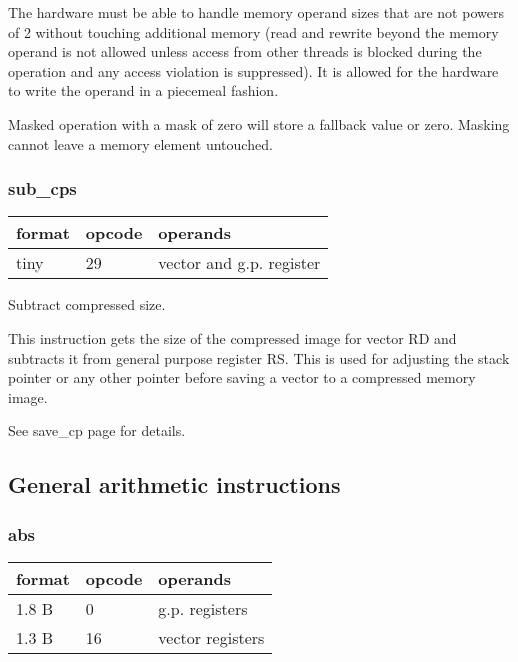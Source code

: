 \documentclass[forwardcom.tex]{subfiles}
\begin{document}
The hardware must be able to handle memory operand sizes that are not powers of 2 without touching additional memory (read and rewrite beyond the memory operand is not allowed unless access from other threads is blocked during the operation and any access violation is suppressed). 
It is allowed for the hardware to write the operand in a piecemeal fashion.
\vspace{2mm}

Masked operation with a mask of zero will store a fallback value or zero. Masking cannot leave a memory element untouched.

\subsubsection{sub\_cps}
\label{table:subCpsInstruction}
\begin{tabular}{|p{12mm}|p{12mm}|p{110mm}|}
\hline
\bfseries format & \bfseries opcode & \bfseries operands \\ \hline
tiny & 29 & vector and g.p. register \\ \hline
\end{tabular}
\vspace{2mm}

Subtract compressed size.
\vspace{2mm}

This instruction gets the size of the compressed image for vector RD and subtracts it from general purpose register RS.
This is used for adjusting the stack pointer or any other pointer
before saving a vector to a compressed memory image.
\vspace{2mm}

See save\_cp page \pageref{table:saveCpInstruction} for details.

\subsection{General arithmetic instructions}

\subsubsection{abs}
\label{table:absInstruction}
\begin{tabular}{|p{12mm}|p{12mm}|p{110mm}|}
\hline
\bfseries format & \bfseries opcode & \bfseries operands \\ \hline
1.8 B &  0 & g.p. registers \\ \hline
1.3 B & 16 & vector registers \\ \hline
\end{tabular}
\vspace{2mm}
\end{document}
